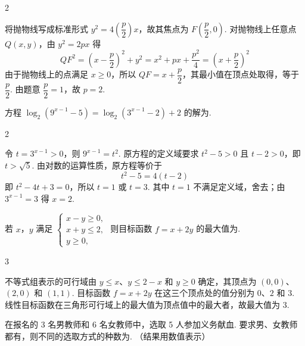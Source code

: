 \begin{answer}
2
\end{answer}

\begin{solution}
将抛物线写成标准形式 \(y^2=4\left(\dfrac p2\right)x\)，故其焦点为 \(F\left(\dfrac p2,0\right)\). 对抛物线上任意点 \(Q(x,y)\)，由 \(y^2=2px\) 得
\[
QF^2=\left(x-\frac p2\right)^2+y^2=x^2+px+\frac{p^2}{4}=\left(x+\frac p2\right)^2
\]
由于抛物线上的点满足 \(x\geqslant0\)，所以 \(QF=x+\dfrac p2\)，其最小值在顶点处取得，等于 \(\dfrac p2\). 由题意 \(\dfrac p2=1\)，故 \(p=2\).
\end{solution}

\begin{problem}
方程 \( \log_{2}(9^{x-1}-5)=\log_{2}(3^{x-1}-2)+2 \) 的解为\fillinblank{}.
\end{problem}

\begin{answer}
2
\end{answer}

\begin{solution}
令 \(t=3^{x-1}>0\)，则 \(9^{x-1}=t^2\). 原方程的定义域要求 \(t^2-5>0\) 且 \(t-2>0\)，即 \(t>\sqrt{5}\). 由对数的运算性质，原方程等价于
\[
t^2-5=4(t-2)
\]
即 \(t^2-4t+3=0\)，所以 \(t=1\) 或 \(t=3\). 其中 \(t=1\) 不满足定义域，舍去；由 \(3^{x-1}=3\) 得 \(x=2\).
\end{solution}

\begin{problem}
若 \(x\)，\(y\) 满足 \(\begin{cases}
x - y \geqslant 0,\\
x + y \leqslant 2,\\
y \geqslant 0,
\end{cases}\) 则目标函数 \(f = x + 2y\) 的最大值为\fillinblank{}.
\end{problem}

\begin{answer}
3
\end{answer}

\begin{solution}
不等式组表示的可行域由 \(y\leqslant x\)、\(y\leqslant2-x\) 和 \(y\geqslant0\) 确定，其顶点为 \((0,0)\)、\((2,0)\) 和 \((1,1)\). 目标函数 \(f=x+2y\) 在这三个顶点处的值分别为 \(0\)、\(2\) 和 \(3\). 线性目标函数在三角形可行域上的最大值为顶点值中的最大者，故最大值为 \(3\).
\end{solution}

\begin{problem}
在报名的 3 名男教师和 6 名女教师中，选取 5 人参加义务献血. 要求男、女教师都有，则不同的选取方式的种数为\fillinblank{}. （结果用数值表示）
\end{problem}

